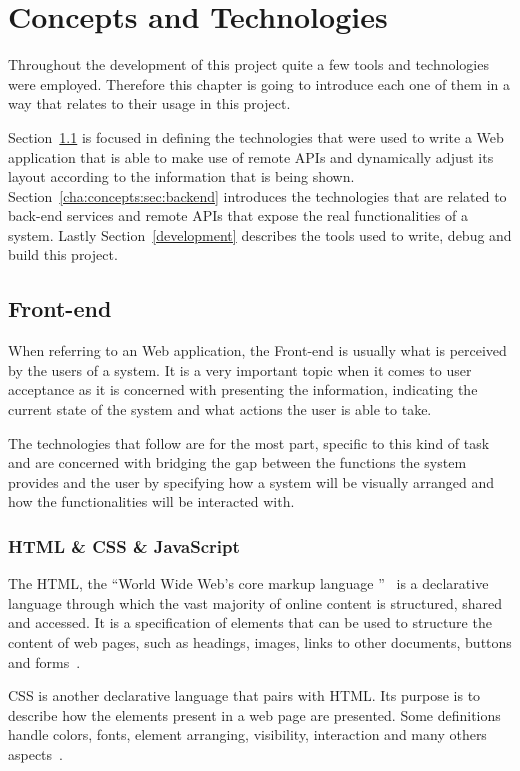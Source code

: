 \chapter{Concepts and Technologies}\label{cha:concepts}
Throughout the development of this project quite a few tools and technologies were employed. Therefore this chapter is going to introduce each one of them in a way that relates to their usage in this project.

Section~\ref{cha:concepts:sec:frontend} is focused in defining the technologies that were used to write a Web application that is able to make use of remote \gls{API}s and dynamically adjust its layout according to the information that is being shown.
Section~\ref{cha:concepts:sec:backend} introduces the technologies that are related to back-end services and remote \gls{API}s that expose the real functionalities of a system. Lastly Section~\ref{development} describes the tools used to write, debug and build this project.

\section{Front-end}\label{cha:concepts:sec:frontend}
When referring to an Web application, the Front-end is usually what is perceived by the users of a system. It is a very important topic when it comes to user acceptance as it is concerned with presenting the information, indicating the current state of the system and what actions the user is able to take.

The technologies that follow are for the most part, specific to this kind of task and are concerned with bridging the gap between the functions the system provides and the user by specifying how a system will be visually arranged and how the functionalities will be interacted with.


\subsection{HTML \& CSS \& JavaScript}
The \gls{HTML}, the ``World Wide Web's core markup language ''~\cite{html} is a declarative language through which the vast majority of online content is structured, shared and accessed. It is a specification of elements that can be used to structure the content of web pages, such as headings, images, links to other documents, buttons and forms~\cite{htmlcss}.

\gls{CSS} is another declarative language that pairs with HTML. Its purpose is to describe how the elements present in a web page are presented.
Some definitions handle colors, fonts, element arranging, visibility, interaction and many others aspects~\cite{htmlcss}.

